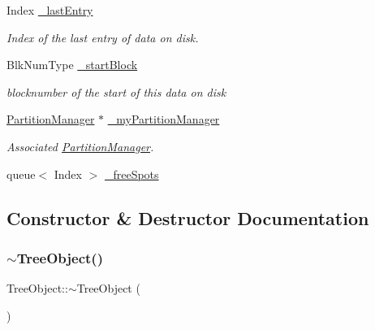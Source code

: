 \begin{DoxyCompactItemize}
Index \mbox{\hyperlink{class_tree_object_a1418b7078e9fbb06506a310ad9417c52}{\+\_\+last\+Entry}}
\begin{DoxyCompactList}\small\item\em Index of the last entry of data on disk. \end{DoxyCompactList}\item 
Blk\+Num\+Type \mbox{\hyperlink{class_tree_object_a5872ffdaa0c1a0cbf393da9a8a7657f3}{\+\_\+start\+Block}}
\begin{DoxyCompactList}\small\item\em blocknumber of the start of this data on disk \end{DoxyCompactList}\item 
\mbox{\hyperlink{class_partition_manager}{Partition\+Manager}} $\ast$ \mbox{\hyperlink{class_tree_object_a0b2ab130a5b95945bbd81250f667d63b}{\+\_\+my\+Partition\+Manager}}
\begin{DoxyCompactList}\small\item\em Associated \mbox{\hyperlink{class_partition_manager}{Partition\+Manager}}. \end{DoxyCompactList}\item 
queue$<$ Index $>$ \mbox{\hyperlink{class_tree_object_a43defc5d87c903cdc3e36edc3323ef87}{\+\_\+free\+Spots}}
\end{DoxyCompactItemize}


\subsection{Constructor \& Destructor Documentation}
\mbox{\label{class_tree_object_a0be0e98771c0ccbeee1930c340d372a9}} 
\subsubsection{\texorpdfstring{$\sim$\+Tree\+Object()}{~TreeObject()}}
{\footnotesize\ttfamily Tree\+Object\+::$\sim$\+Tree\+Object (\begin{DoxyParamCaption}{ }\end{DoxyParamCaption})\hspace{0.3cm}{\ttfamily [virtual]}}

\mbox{\label{class_tree_object_a1ef90156e6b45ddef28c59a89cd1097d}} 
